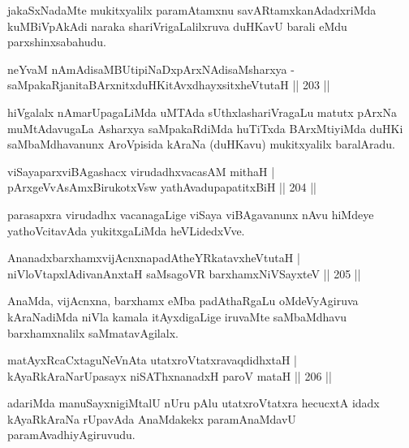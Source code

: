 \begin{artha}
jakaSxNadaMte mukitxyalilx paramAtamxnu savARtamxkanAdadxriMda kuMBiVpAkAdi naraka shariVrigaLalilxruva duHKavU barali eMdu parxshinxsabahudu.
\end{artha}


\begin{shl}
neYvaM nAmAdisaMBUtipiNaDxpArxNAdisaMsharxya -\\
saMpakaRjanitaBArxnitxduHKitAvxdhayxsitxheVtutaH \hfill || 203 ||
\end{shl}

\begin{artha}
hiVgalalx nAmarUpagaLiMda uMTAda sUthxlashariVragaLu matutx pArxNa muMtAdavugaLa Asharxya saMpakaRdiMda huTiTxda BArxMtiyiMda duHKi saMbaMdhavanunx AroVpisida kAraNa (duHKavu) mukitxyalilx baralAradu.
\end{artha}

\begin{shl}
viSayaparxviBAgashacx virudadhxvacasAM mithaH |\\
pArxgeVvAsAmxBirukotxV\s sw yathAvadupapatitxBiH \hfill || 204 ||
\end{shl}

\begin{artha}
parasapxra virudadhx vacanagaLige viSaya viBAgavanunx nAvu hiMdeye yathoVcitavAda yukitxgaLiMda heVLidedxVve.
\end{artha}

\begin{shl}
AnanadxbarxhamxvijAcnxnapadAtheYRkatavxheVtutaH |\\
niVloVtapxlAdivanAnxtaH saMsagoVR barxhamxNiVSayxteV \hfill || 205 ||
\end{shl}

\begin{artha}%
AnaMda, vijAcnxna, barxhamx eMba padAthaRgaLu oMdeVyAgiruva kAraNadiMda niVla kamala itAyxdigaLige iruvaMte saMbaMdhavu barxhamxnalilx saMmatavAgilalx.
\end{artha}

\begin{shl}
matAyxRcaCxtaguNeVnAta utatxroVtatxravaqdidhxtaH |\\
kAyaRkAraNarUpasayx niSAThx\s \s nanadxH paroV mataH \hfill || 206 ||
\end{shl}

\begin{artha}
adariMda manuSayxnigiMtalU nUru pAlu utatxroVtatxra hecucxtA idadx kAyaRkAraNa rUpavAda AnaMdakekx paramAnaMdavU paramAvadhiyAgiruvudu.
\end{artha}


